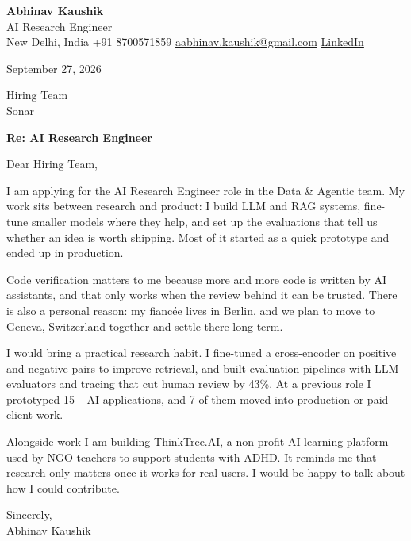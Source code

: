 \documentclass[11pt,a4paper]{article}
\begin{document}
{\Large\bfseries Abhinav Kaushik}\\
AI Research Engineer\\
New Delhi, India \textbar{} +91 8700571859 \textbar{} \href{mailto:aabhinav.kaushik@gmail.com}{aabhinav.kaushik@gmail.com} \textbar{} \href{https://www.linkedin.com/in/abhinav-kaushik10/}{LinkedIn}  

September 27, 2026

Hiring Team\\
Sonar

\textbf{Re: AI Research Engineer}

Dear Hiring Team,

I am applying for the AI Research Engineer role in the Data \& Agentic team. My work sits between research and product: I build LLM and RAG systems, fine-tune smaller models where they help, and set up the evaluations that tell us whether an idea is worth shipping. Most of it started as a quick prototype and ended up in production.

Code verification matters to me because more and more code is written by AI assistants, and that only works when the review behind it can be trusted. There is also a personal reason: my fiancée lives in Berlin, and we plan to move to Geneva, Switzerland together and settle there long term.

I would bring a practical research habit. I fine-tuned a cross-encoder on positive and negative pairs to improve retrieval, and built evaluation pipelines with LLM evaluators and tracing that cut human review by 43\%. At a previous role I prototyped 15+ AI applications, and 7 of them moved into production or paid client work.

Alongside work I am building ThinkTree.AI, a non-profit AI learning platform used by NGO teachers to support students with ADHD. It reminds me that research only matters once it works for real users. I would be happy to talk about how I could contribute.

Sincerely,\\[4pt]
Abhinav Kaushik
\end{document}
